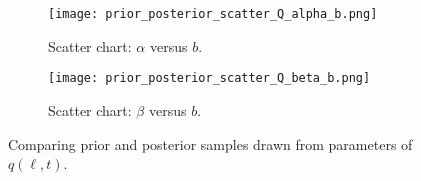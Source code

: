 \begin{figure*}[!htb]
  \centering
  \begin{subfigure}[b]{0.75\textwidth}
    \centering
    \texttt{[image: prior\_posterior\_scatter\_Q\_alpha\_b.png]}
    \caption{ 
      Scatter chart: $\alpha$ versus $b$.  
    }
    \label{fig:alphavsb}
  \end{subfigure}
  \hfill
  \begin{subfigure}[b]{0.75\textwidth}
    \centering
    \texttt{[image: prior\_posterior\_scatter\_Q\_beta\_b.png]}
    \caption{
      Scatter chart: $\beta$ versus $b$.  
    }
    \label{fig:betavsb}
  \end{subfigure}
  \caption{
    Comparing prior and posterior samples drawn from parameters of $q(\ell, t)$.
  }
\end{figure*}

%
%
